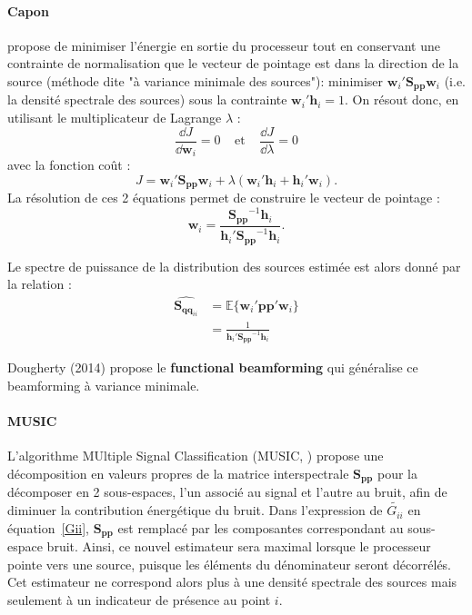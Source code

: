 \paragraph{\tbullet Capon}  \cite{Capon1969} propose de minimiser l'énergie en sortie du processeur tout en conservant une contrainte de normalisation que le vecteur de pointage est dans la direction de la source (méthode dite "à variance minimale des sources"): minimiser $\bm{w}_i'\bm{S_{pp}}\bm{w}_i$ (i.e. la densité spectrale des sources) sous la contrainte $\bm{w}_i'\bm{h}_i=1$.
On résout donc, en utilisant le multiplicateur de Lagrange $\lambda$ : 
\begin{equation}
\frac{\dd J}{\dd\bm{w}_i}=0~~~~~\text{et}~~~~~\frac{\dd J}{\dd\lambda}=0
\end{equation}
avec la fonction coût : 
\begin{equation}
J=\bm{w}_i'\bm{S_{pp}}\bm{w}_i + \lambda(\bm{w}_i'\bm{h}_i+\bm{h}_i'\bm{w}_i).
\end{equation}
La résolution de ces 2 équations permet de construire le vecteur de pointage : 
\begin{equation}
	\bm{w}_i=\frac{\bm{S_{pp}}^{-1}\bm{h}_{i}}{\bm{h}_i'\bm{S_{pp}}^{-1}\bm{h}_{i}}.
\end{equation}

Le spectre de puissance de la distribution des sources estimée est alors donné par la relation : 
\begin{align}
	\hat{\bm{S}_{\bm{qq}_{ii}}} & = \mathbb{E}\{ \bm{w}_i'\bm{pp}'\bm{w}_i\}\\
	&=\frac{1}{\bm{h}_i'\bm{S_{pp}}^{-1}\bm{h}_i}\label{Gii}
\end{align}

Dougherty (2014) propose le \textbf{functional beamforming} qui généralise ce beamforming à variance minimale.

\paragraph{\tbullet MUSIC} L'algorithme MUltiple Signal Classification (MUSIC, \cite{Schmidt1986}) propose une décomposition en valeurs propres de la matrice interspectrale $\bm{S_{pp}}$ pour la décomposer en 2 sous-espaces, l’un associé au signal et l’autre au bruit, afin de diminuer la contribution énergétique du bruit.  Dans l'expression de $\tilde{G_{ii}}$ en équation~\ref{Gii}, $\bm{S_{pp}}$ est remplacé par les composantes correspondant au sous-espace bruit. Ainsi, ce nouvel estimateur sera maximal lorsque le processeur pointe vers une source, puisque les éléments du dénominateur seront décorrélés. Cet estimateur ne correspond alors plus à une densité spectrale des sources mais seulement à un indicateur de présence au point $i$.\\

